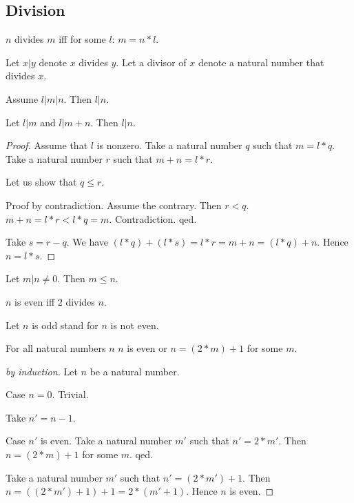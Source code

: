 \documentclass[11pt]{article}
\begin{document}
\subsection{Division}

\begin{forthel}

\begin{definition}
$n$ divides $m$ iff for some $l$: $m = n * l$.
\end{definition}

Let $x | y$ denote $x$ divides $y$.
Let a divisor of $x$ denote a natural number that divides $x$.

\begin{lemma}
Assume $l | m | n$.
Then $l | n$.
\end{lemma}

\begin{lemma}
Let $l | m$ and $l | m + n$.
Then $l | n$.
\end{lemma}
\begin{proof}
Assume that $l$ is nonzero.
Take a natural number $q$ such that $m = l * q$.
Take a natural number $r$ such that $m + n = l * r$.

Let us show that
$q \leq r$.

Proof by contradiction.
Assume the contrary. Then $r < q$.
$m+n = l * r < l * q = m$.
Contradiction. qed.

Take $s = r - q$.
We have $(l * q) + (l * s) = l * r = m + n = (l * q) + n$.
Hence $n = l * s$.
\end{proof}

\begin{lemma}
Let $m | n \neq 0$.
Then $m \leq n$.
\end{lemma}

\begin{definition} $n$ is even iff $2$ divides $n$.
\end{definition}

Let $n$ is odd stand for $n$ is not even.

\begin{lemma}
For all natural numbers $n$ $n$ is even or $n = (2 * m) + 1$ for some $m$.
\end{lemma}
\begin{proof}[by induction]
Let $n$ be a natural number.

Case $n = 0$. Trivial.

Take $n' = n - 1$.

Case $n'$ is even. Take a natural number $m'$ such that $n' = 2 * m'$.
Then $n = (2 * m) + 1$ for some $m$. qed.

Take a natural number $m'$ such that $n' = (2 * m') + 1$.
Then $n = ((2 * m') + 1) + 1 = 2 * (m' + 1)$.
Hence $n$ is even.

\end{proof}

\end{forthel}
\end{document}
